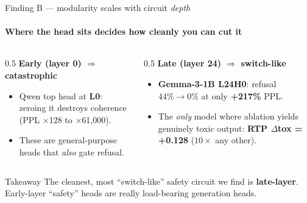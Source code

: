 \documentclass[aspectratio=169]{beamer}
\newcommand{\hl}[1]{\textcolor{themeblue}{\textbf{#1}}}
\newcommand{\hlo}[1]{\textcolor{themeorange!75!black}{\textbf{#1}}}
\begin{document}
\begin{frame}{Finding B --- modularity scales with circuit \emph{depth}}
  \framesubtitle{Where the head sits decides how cleanly you can cut it}
  \begin{columns}[T]
    \begin{column}{0.5\textwidth}
      \textbf{Early (layer 0) $\Rightarrow$ catastrophic}
      \begin{itemize}
        \item Qwen top head at \hlo{L0}: zeroing it destroys coherence (PPL $\times$128 to $\times$61{,}000).
        \item These are general-purpose heads that \emph{also} gate refusal.
      \end{itemize}
    \end{column}
    \begin{column}{0.5\textwidth}
      \textbf{Late (layer 24) $\Rightarrow$ switch-like}
      \begin{itemize}
        \item \hl{Gemma-3-1B L24H0}: refusal $44\%\!\rightarrow\!0\%$ at only \hlo{+217\%} PPL.
        \item The \emph{only} model where ablation yields genuinely toxic output: \hl{RTP $\Delta$tox = +0.128} ($10\times$ any other).
      \end{itemize}
    \end{column}
  \end{columns}
  \vspace{4pt}
  \begin{block}{Takeaway}
    The cleanest, most ``switch-like'' safety circuit we find is \hl{late-layer}. Early-layer ``safety'' heads are really load-bearing generation heads.
  \end{block}
\end{frame}
\end{document}
